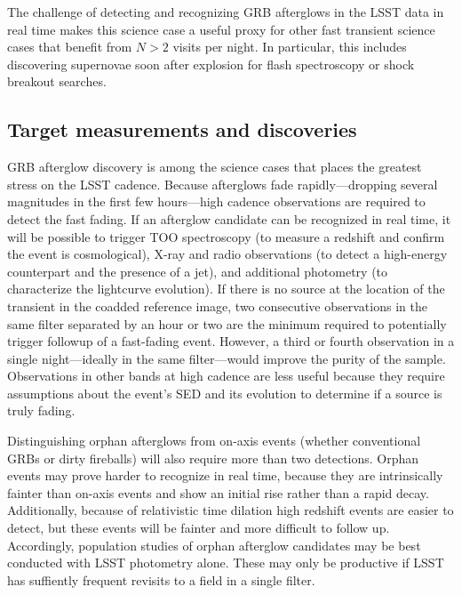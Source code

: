 


The challenge of detecting and recognizing GRB afterglows in the LSST data in 
real time makes this science case a useful proxy for other fast transient 
science cases that benefit from $N > 2$ visits per night.  In particular, this 
includes discovering supernovae soon after explosion for flash spectroscopy or 
shock breakout searches.



\subsection{Target measurements and discoveries}
\label{sec:\secname:targets}

GRB afterglow discovery is among the science cases that places the greatest stress on the LSST cadence.  Because afterglows fade rapidly---dropping several magnitudes in the first few hours---high cadence observations are required to detect the fast fading.  
If an afterglow candidate can be recognized in real time, it will be possible to trigger TOO spectroscopy (to measure a redshift and confirm the event is cosmological), X-ray and radio observations (to detect a high-energy counterpart and the presence of a jet), and additional photometry (to characterize the lightcurve evolution).  If there is no source at the location of the transient in the coadded reference image, two consecutive observations in the same filter separated by an hour or two are the minimum required to potentially trigger followup of a fast-fading event.  
However, a third or fourth observation in a single night---ideally in the same filter---would improve the purity of the sample.  Observations in other bands at high cadence are less useful because they require assumptions about the event's SED and its evolution to determine if a source is truly fading.

Distinguishing orphan afterglows from on-axis events (whether conventional GRBs or dirty fireballs) will also require more than two detections.  Orphan events may prove harder to recognize in real time, because they are intrinsically fainter than on-axis events and show an initial rise rather than a rapid decay.  
Additionally, because of relativistic time dilation high redshift events are easier to detect, but these events will be fainter and more difficult to follow up.
Accordingly, population studies of orphan afterglow candidates may be best conducted with LSST photometry alone.  These may only be productive if LSST has suffiently frequent revisits to a field in a single filter.

